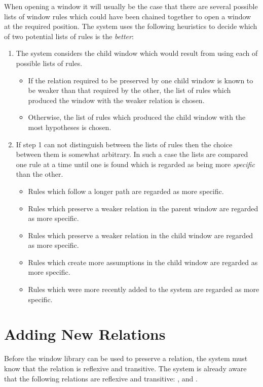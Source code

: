 When opening a window it will usually be the case that there are several
possible lists of window rules which could have been chained together 
to open a window at the required position.
The system uses the following heuristics to decide which of two potential
lists of rules is the {\it better}:
\begin{enumerate}
	\item	The system considers the child window which would result from
		using each of possible lists of rules.
		\begin{itemize}	
			\item	If the relation required to be preserved by one
				child window is known to be weaker than that
				required by the other, the list of rules
				which produced the window with the weaker
				relation is chosen.
			\item	Otherwise, the list of rules which produced
				the child window with the most hypotheses is
				chosen.
		\end{itemize}
	\item	If step 1 can not distinguish between the lists of rules then
		the choice between them is somewhat arbitrary.
		In such a case the lists are compared one rule at
		a time until one is found which is regarded as being more
		{\it specific}\/ than the other.
		\begin{itemize}
			\item	Rules which follow a longer path are regarded as
				more specific.
			\item	Rules which preserve a weaker relation in the
				parent window are regarded as more specific.
			\item	Rules which preserve a weaker relation in the
				child window are regarded as more specific.
			\item	Rules which create more assumptions in the
				child window are regarded as more specific.
			\item	Rules which were more recently added to the
				system are regarded as more specific.
		\end{itemize}
\end{enumerate}

\section{Adding New Relations}	\label{sec:rel}

Before the window library can be used to preserve a relation, the
system must know that the relation is reflexive and transitive.
The system is already aware that the following relations are reflexive
and transitive: ,  and .

